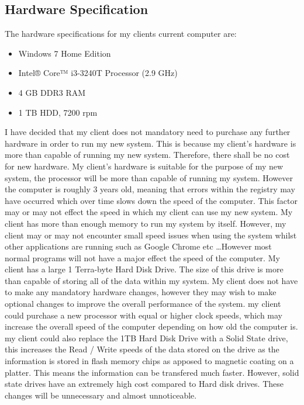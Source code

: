 \subsection{Hardware Specification}
	
The hardware specifications for my clients current computer are: \par

\begin{itemize}
\item Windows 7 Home Edition
\item Intel® Core™ i3-3240T Processor (2.9 GHz)
\item 4 GB DDR3 RAM
\item 1 TB HDD, 7200 rpm
\end{itemize}




I have decided that my client does not mandatory need to purchase any further hardware in order to run my new system. This is because my client's hardware is more than capable of running my new system. Therefore, there shall be no cost for new hardware. My client's hardware is suitable for the purpose of my new system, the processor will be more than capable of running my system. However the computer is roughly 3 years old, meaning that errors within the registry may have occurred which over time slows down the speed of the computer. This factor may or may not effect the speed in which my client can use my new system. My client has more than enough memory to run my system by itself. However, my client may or may not encounter small speed issues when using the system whilst other applications are running such as Google Chrome etc \ldots However most normal programs will not have a major effect the speed of the computer.  My client has a large 1 Terra-byte Hard Disk Drive. The size of this drive is more than capable of storing all of the data within my system. My client does not have to make any mandatory hardware changes, however they may wish to make optional changes to improve the overall performance of the system. my client could purchase a new processor with equal or higher clock speeds, which may increase the overall speed of the computer depending on how old the computer is.  my client could also replace the 1TB Hard Disk Drive with a Solid State drive, this increases the Read / Write speeds of the data stored on the drive as the information is stored in flash memory chips as apposed to magnetic coating on a platter. This means the information can be transfered much faster. However, solid state drives have an extremely high cost compared to Hard disk drives. These changes will be unnecessary and almost unnoticeable.

